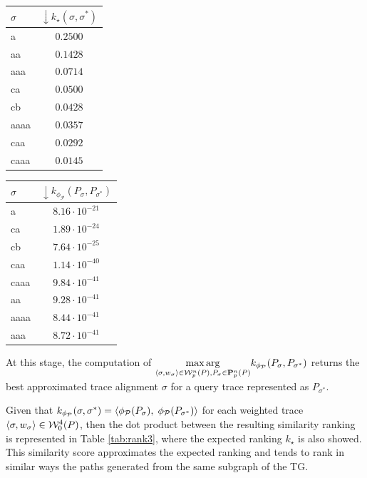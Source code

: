 \begin{table}[!t]
{\begin{tabular}{l|c}
	{$\sigma$} &
	{$\boldsymbol{\downarrow}k_\star(\sigma,\sigma^*)$} \\
	
	
	\midrule
	{a}  &  $0.2500$ \\
	{aa}  &  $0.1428$  \\
	{aaa}  & $0.0714$ \\
	{ca}  &   $0.0500$\\
	{cb}  & $0.0428$ \\
	{aaaa}  &  $0.0357$ \\
	{caa}  &  $0.0292$ \\
	{caaa}  &   $0.0145$ \\
	\bottomrule
\end{tabular}\quad	\begin{tabular}{l|c}
	\toprule
	
	{$\sigma$} &
	{$\boldsymbol{\downarrow}k_{\phi_{\mathcal{P}}}(P_\sigma,P_{\sigma^*})$} \\

	
	\midrule
	{a}  & $8.16\cdot 10^{-21}$ \\
	{ca}  &   $1.89\cdot 10^{-24}$\\
	{cb}  &   $7.64\cdot 10^{-25}$\\
	{caa}  &$1.14\cdot 10^{-40}$\\
	{caaa}  &  $9.84\cdot 10^{-41}$\\
	{aa}  &  $9.28\cdot 10^{-41}$ \\
	{aaaa}  & $8.44\cdot 10^{-41}$\\
	{aaa}  &  $8.72\cdot 10^{-41}$\\
	\bottomrule
\end{tabular}}
\end{table}


At this stage, the computation of $\underset{\braket{\sigma,w_\sigma}\in \mathcal{W}_p^n(P), P_\sigma\in\mathbf{P}_p^n(P)}{\max\arg} k_{\phi_\mathcal{P}}(P_\sigma, P_{\sigma^*})$ returns the best approximated trace alignment $\sigma$ for a query trace represented as $P_{\sigma^*}$. %

\begin{example}\label{ex:11}
	Given that $k_{\phi_{\mathcal{P}}}(\sigma,\sigma^*)=\braket{\phi_{\mathcal{P}}(P_\sigma),\;\phi_{\mathcal{P}}(P_{\sigma^*})}$ for each weighted trace $\braket{\sigma,w_\sigma}\in\mathcal{W}_0^4(P)$, then the dot product between the resulting similarity ranking is represented in Table \ref{tab:rank3}, where the expected ranking $k_\star$ is also showed. This similarity score approximates the expected ranking  and tends to rank in similar ways the paths generated from the same subgraph of the TG.
\end{example}


